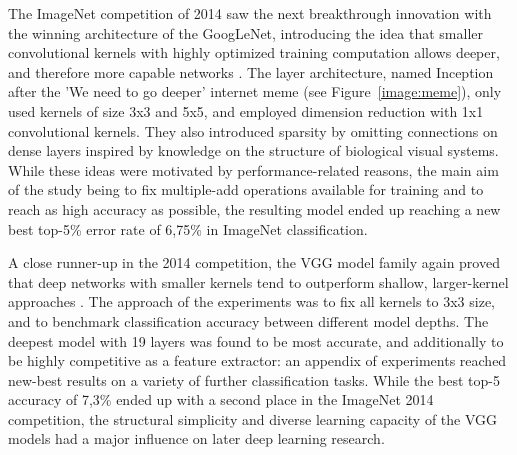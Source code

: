 \documentclass{article}
\begin{document}
The ImageNet competition of 2014 saw the next breakthrough innovation with the winning architecture of the GoogLeNet,
introducing the idea that smaller convolutional kernels with highly optimized training computation allows deeper,
and therefore more capable networks \cite{googlelenet}. The layer architecture, named Inception after the 'We 
need to go deeper' internet meme (see Figure~\ref{image:meme}), only used kernels of size 3x3 and 5x5, and
employed dimension reduction with 1x1 convolutional kernels. They also introduced sparsity by omitting connections on 
dense layers inspired by knowledge on the structure of biological visual systems. While these ideas were motivated
by performance-related reasons, the main aim of the study being to fix multiple-add operations available for training 
and to reach as high accuracy as possible, the resulting model ended up reaching a new best top-5\% error rate of 6,75\%
in ImageNet classification.

A close runner-up in the 2014 competition, the VGG model family again proved that deep networks 
with smaller kernels tend to outperform shallow, larger-kernel approaches \cite{vgg}. The approach 
of the experiments was to fix all kernels to 3x3 size, and to benchmark classification accuracy between 
different model depths. The deepest model with 19 layers was found to be most accurate, and additionally 
to be highly competitive as a feature extractor: an appendix of experiments reached new-best results on a variety of 
further classification tasks. While the 
best top-5 accuracy of 7,3\% ended up with a second place in the ImageNet 2014 competition, the  structural simplicity
and diverse learning capacity of the VGG models had a major influence on later deep learning research.
\end{document}
